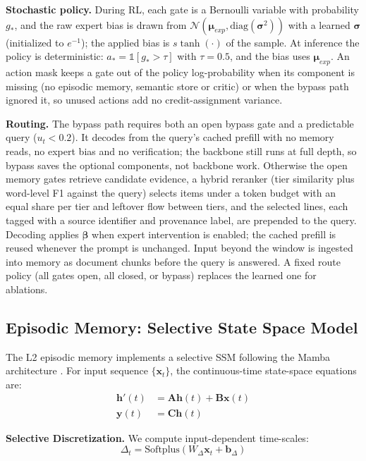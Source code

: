 \documentclass{article}
\begin{document}
\textbf{Stochastic policy.} During RL, each gate is a Bernoulli variable with probability $g_*$, and the raw expert bias is drawn from $\mathcal{N}(\boldsymbol{\mu}_{exp}, \text{diag}(\boldsymbol{\sigma}^2))$ with a learned $\boldsymbol{\sigma}$ (initialized to $e^{-1}$); the applied bias is $s\tanh(\cdot)$ of the sample. At inference the policy is deterministic: $a_* = \mathbb{1}[g_* > \tau]$ with $\tau = 0.5$, and the bias uses $\boldsymbol{\mu}_{exp}$. An action mask keeps a gate out of the policy log-probability when its component is missing (no episodic memory, semantic store or critic) or when the bypass path ignored it, so unused actions add no credit-assignment variance.

\textbf{Routing.} The bypass path requires both an open bypass gate and a predictable query ($u_t < 0.2$). It decodes from the query's cached prefill with no memory reads, no expert bias and no verification; the backbone still runs at full depth, so bypass saves the optional components, not backbone work. Otherwise the open memory gates retrieve candidate evidence, a hybrid reranker (tier similarity plus word-level F1 against the query) selects items under a token budget with an equal share per tier and leftover flow between tiers, and the selected lines, each tagged with a source identifier and provenance label, are prepended to the query. Decoding applies $\boldsymbol{\beta}$ when expert intervention is enabled; the cached prefill is reused whenever the prompt is unchanged. Input beyond the window is ingested into memory as document chunks before the query is answered. A fixed route policy (all gates open, all closed, or bypass) replaces the learned one for ablations.

\subsection{Episodic Memory: Selective State Space Model}

The L2 episodic memory implements a selective SSM following the Mamba architecture \cite{gu2023mamba}. For input sequence $\{\mathbf{x}_t\}$, the continuous-time state-space equations are:
\begin{align}
\mathbf{h}'(t) &= \mathbf{A} \mathbf{h}(t) + \mathbf{B} \mathbf{x}(t) \\
\mathbf{y}(t) &= \mathbf{C} \mathbf{h}(t)
\end{align}

\textbf{Selective Discretization.} We compute input-dependent time-scales:
\begin{equation}
\Delta_t = \text{Softplus}(W_\Delta \mathbf{x}_t + \mathbf{b}_\Delta)
\end{equation}
\end{document}
